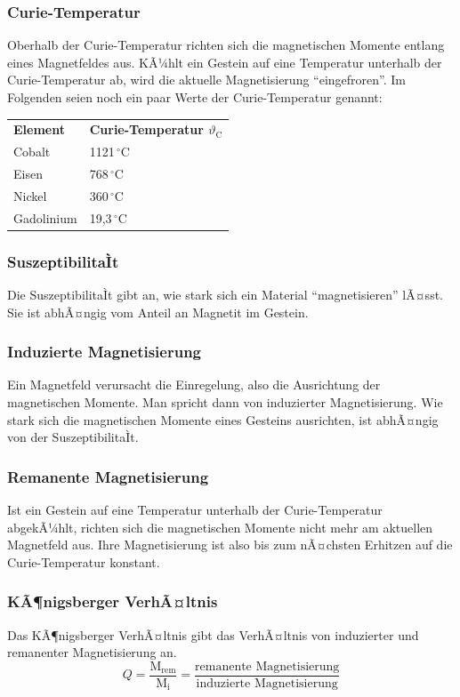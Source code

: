 \subsubsection{Curie-Temperatur}
Oberhalb der Curie-Temperatur richten sich die magnetischen Momente entlang eines Magnetfeldes aus. KÃ¼hlt ein Gestein auf eine Temperatur unterhalb der Curie-Temperatur ab, wird die aktuelle Magnetisierung "`eingefroren"'. Im Folgenden seien noch ein paar Werte der Curie-Temperatur genannt:

\begin{tabular}{ll}
  \textbf{Element} & \textbf{Curie-Temperatur $\vartheta_\text{C}$}\\
  Cobalt & 1121\,$^{\circ}$C\\
  Eisen & 768\,$^{\circ}$C\\
  Nickel & 	360\,$^{\circ}$C\\
  Gadolinium & 19,3\,$^{\circ}$C
\end{tabular} 

\subsubsection{SuszeptibilitaÌt}
Die SuszeptibilitaÌt gibt an, wie stark sich ein Material "`magnetisieren"' lÃ¤sst. Sie ist abhÃ¤ngig vom Anteil an Magnetit im Gestein.

\subsubsection{Induzierte Magnetisierung}
Ein Magnetfeld verursacht die Einregelung, also die Ausrichtung der magnetischen Momente. Man spricht dann von induzierter Magnetisierung. Wie stark sich die magnetischen Momente eines Gesteins ausrichten, ist abhÃ¤ngig von der SuszeptibilitaÌt.

\subsubsection{Remanente Magnetisierung}
Ist ein Gestein auf eine Temperatur unterhalb der Curie-Temperatur abgekÃ¼hlt, richten sich die magnetischen Momente nicht mehr am aktuellen Magnetfeld aus. Ihre Magnetisierung ist also bis zum nÃ¤chsten Erhitzen auf die Curie-Temperatur konstant.

\subsubsection{KÃ¶nigsberger VerhÃ¤ltnis}
Das KÃ¶nigsberger VerhÃ¤ltnis gibt das VerhÃ¤ltnis von induzierter und remanenter Magnetisierung an. \begin{equation*}
	Q = \frac{\text{M}_{\text{rem}}}{\text{M}_{\text{i}}} = \frac{\text{remanente Magnetisierung}}{\text{induzierte Magnetisierung}}
\end{equation*}

